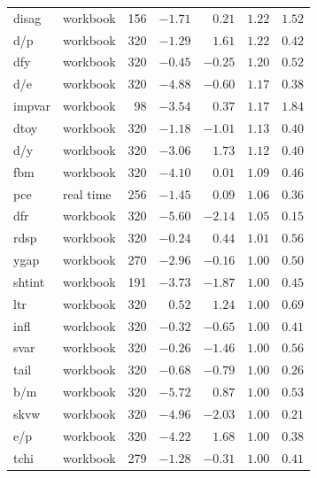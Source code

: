\begin{tabular}{llrrrrr}
    disag & workbook & 156 & $-1.71$ & $0.21$ & $1.22$ & $1.52$ \\
    d/p & workbook & 320 & $-1.29$ & $1.61$ & $1.22$ & $0.42$ \\
    dfy & workbook & 320 & $-0.45$ & $-0.25$ & $1.20$ & $0.52$ \\
    d/e & workbook & 320 & $-4.88$ & $-0.60$ & $1.17$ & $0.38$ \\
    impvar & workbook & 98 & $-3.54$ & $0.37$ & $1.17$ & $1.84$ \\
    dtoy & workbook & 320 & $-1.18$ & $-1.01$ & $1.13$ & $0.40$ \\
    d/y & workbook & 320 & $-3.06$ & $1.73$ & $1.12$ & $0.40$ \\
    fbm & workbook & 320 & $-4.10$ & $0.01$ & $1.09$ & $0.46$ \\
    pce & real time & 256 & $-1.45$ & $0.09$ & $1.06$ & $0.36$ \\
    dfr & workbook & 320 & $-5.60$ & $-2.14$ & $1.05$ & $0.15$ \\
    rdsp & workbook & 320 & $-0.24$ & $0.44$ & $1.01$ & $0.56$ \\
    ygap & workbook & 270 & $-2.96$ & $-0.16$ & $1.00$ & $0.50$ \\
    shtint & workbook & 191 & $-3.73$ & $-1.87$ & $1.00$ & $0.45$ \\
    ltr & workbook & 320 & $0.52$ & $1.24$ & $1.00$ & $0.69$ \\
    infl & workbook & 320 & $-0.32$ & $-0.65$ & $1.00$ & $0.41$ \\
    svar & workbook & 320 & $-0.26$ & $-1.46$ & $1.00$ & $0.56$ \\
    tail & workbook & 320 & $-0.68$ & $-0.79$ & $1.00$ & $0.26$ \\
    b/m & workbook & 320 & $-5.72$ & $0.87$ & $1.00$ & $0.53$ \\
    skvw & workbook & 320 & $-4.96$ & $-2.03$ & $1.00$ & $0.21$ \\
    e/p & workbook & 320 & $-4.22$ & $1.68$ & $1.00$ & $0.38$ \\
    tchi & workbook & 279 & $-1.28$ & $-0.31$ & $1.00$ & $0.41$ \\
    \bottomrule
\end{tabular}
